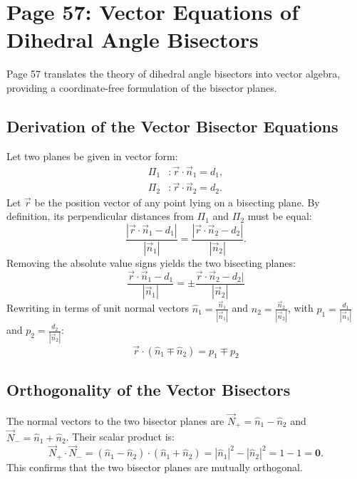 \section{Page 57: Vector Equations of Dihedral Angle Bisectors}
\label{sec:page57}

\begin{conceptbox}
Page 57 translates the theory of dihedral angle bisectors into vector algebra, providing a coordinate-free formulation of the bisector planes.
\end{conceptbox}

\subsection{Derivation of the Vector Bisector Equations}
Let two planes be given in vector form:
\begin{align}
    \Pi_1 &: \vec{r} \cdot \vec{n}_1 = d_1, \\
    \Pi_2 &: \vec{r} \cdot \vec{n}_2 = d_2.
\end{align}
Let $\vec{r}$ be the position vector of any point lying on a bisecting plane.
By definition, its perpendicular distances from $\Pi_1$ and $\Pi_2$ must be equal:
\begin{equation}
    \frac{|\vec{r} \cdot \vec{n}_1 - d_1|}{|\vec{n}_1|} = \frac{|\vec{r} \cdot \vec{n}_2 - d_2|}{|\vec{n}_2|}.
\end{equation}
Removing the absolute value signs yields the two bisecting planes:
\begin{equation}
    \boxed{\frac{\vec{r} \cdot \vec{n}_1 - d_1}{|\vec{n}_1|} = \pm \frac{\vec{r} \cdot \vec{n}_2 - d_2|}{|\vec{n}_2|}}
\end{equation}
Rewriting in terms of unit normal vectors $\hat{n}_1 = \frac{\vec{n}_1}{|\vec{n}_1|}$ and $\hat{n}_2 = \frac{\vec{n}_2}{|\vec{n}_2|}$, with $p_1 = \frac{d_1}{|\vec{n}_1|}$ and $p_2 = \frac{d_2}{|\vec{n}_2|}$:
\begin{equation}
    \boxed{\vec{r} \cdot (\hat{n}_1 \mp \hat{n}_2) = p_1 \mp p_2}
\end{equation}

\subsection{Orthogonality of the Vector Bisectors}
The normal vectors to the two bisector planes are $\vec{N}_+ = \hat{n}_1 - \hat{n}_2$ and $\vec{N}_- = \hat{n}_1 + \hat{n}_2$.
Their scalar product is:
\begin{equation}
    \vec{N}_+ \cdot \vec{N}_- = (\hat{n}_1 - \hat{n}_2) \cdot (\hat{n}_1 + \hat{n}_2) = |\hat{n}_1|^2 - |\hat{n}_2|^2 = 1 - 1 = \mathbf{0}.
\end{equation}
This confirms that the two bisector planes are mutually orthogonal.

